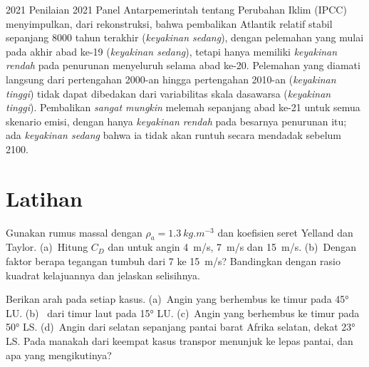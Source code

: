 \begin{dated}{2021}
Penilaian 2021 Panel Antarpemerintah tentang Perubahan Iklim (IPCC) menyimpulkan, dari rekonstruksi, bahwa pembalikan Atlantik relatif stabil sepanjang \num{8000} tahun terakhir (\emph{keyakinan sedang}), dengan pelemahan yang mulai pada akhir abad ke-19 (\emph{keyakinan sedang}), tetapi hanya memiliki \emph{keyakinan rendah} pada penurunan menyeluruh selama abad ke-20. Pelemahan yang diamati langsung dari pertengahan 2000-an hingga pertengahan 2010-an (\emph{keyakinan tinggi}) tidak dapat dibedakan dari variabilitas skala dasawarsa (\emph{keyakinan tinggi}). Pembalikan \emph{sangat mungkin} melemah sepanjang abad ke-21 untuk semua skenario emisi, dengan hanya \emph{keyakinan rendah} pada besarnya penurunan itu; ada \emph{keyakinan sedang} bahwa ia tidak akan runtuh secara mendadak sebelum 2100.
\end{dated}

\section{Latihan}

\begin{exercise}[$\star$]\label{exo:b1:ocean-circulation:1}
Gunakan rumus massal dengan $\rho_a = \qty{1.3}{kg.m^{-3}}$ dan koefisien seret Yelland dan Taylor. (a)~Hitung $C_D$ dan  untuk angin \qty{4}{m/s}, \qty{7}{m/s} dan \qty{15}{m/s}. (b)~Dengan faktor berapa tegangan tumbuh dari 7 ke \qty{15}{m/s}? Bandingkan dengan rasio kuadrat kelajuannya dan jelaskan selisihnya.
\end{exercise}

\begin{exercise}[$\star$]\label{exo:b1:ocean-circulation:2}
Berikan arah  pada setiap kasus. (a)~Angin yang berhembus ke timur pada \ang{45} LU. (b)~ dari timur laut pada \ang{15} LU. (c)~Angin yang berhembus ke timur pada \ang{50} LS. (d)~Angin dari selatan sepanjang pantai barat Afrika selatan, dekat \ang{23} LS. Pada manakah dari keempat kasus transpor menunjuk ke lepas pantai, dan apa yang mengikutinya?
\end{exercise}

